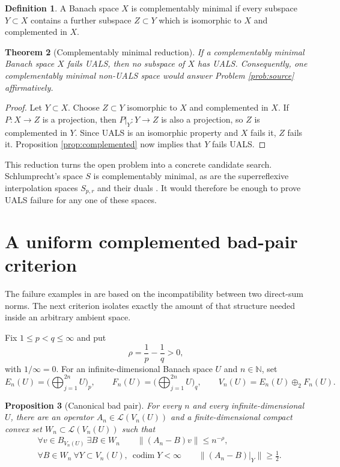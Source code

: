 \documentclass[11pt]{article}
\newtheorem{theorem}{Theorem}[section]
\newtheorem{proposition}[theorem]{Proposition}
\theoremstyle{definition}
\newtheorem{definition}[theorem]{Definition}
\theoremstyle{remark}
\newcommand{\LL}{\mathcal{L}}
\newcommand{\N}{\mathbb{N}}
\newcommand{\codim}{\operatorname{codim}}
\begin{document}
\begin{definition}
A Banach space $X$ is complementably minimal if every subspace $Y\subset X$ contains a further subspace $Z\subset Y$ which is isomorphic to $X$ and complemented in $X$.
\end{definition}

\begin{theorem}[Complementably minimal reduction]\label{thm:cm}
If a complementably minimal Banach space $X$ fails UALS, then no subspace of $X$ has UALS.  Consequently, one complementably minimal non-UALS space would answer Problem \ref{prob:source} affirmatively.
\end{theorem}

\begin{proof}
Let $Y\subset X$.  Choose $Z\subset Y$ isomorphic to $X$ and complemented in $X$.  If $P:X\to Z$ is a projection, then $P|_Y:Y\to Z$ is also a projection, so $Z$ is complemented in $Y$.  Since UALS is an isomorphic property and $X$ fails it, $Z$ fails it.  Proposition \ref{prop:complemented} now implies that $Y$ fails UALS.
\end{proof}

This reduction turns the open problem into a concrete candidate search.  Schlumprecht's space $S$ is complementably minimal, as are the superreflexive interpolation spaces $S_{p,r}$ and their duals \cite{Schlumprecht,CKKM}.  It would therefore be enough to prove UALS failure for any one of these spaces.

\section{A uniform complemented bad-pair criterion}

The failure examples in \cite{AGLM} are based on the incompatibility between two direct-sum norms.  The next criterion isolates exactly the amount of that structure needed inside an arbitrary ambient space.

Fix $1\leq p<q\leq\infty$ and put
\[
  \rho=\frac1p-\frac1q>0,
\]
with $1/\infty=0$.  For an infinite-dimensional Banach space $U$ and $n\in\N$, set
\[
  E_n(U)=\Big(\bigoplus_{j=1}^{2n}U\Big)_p,
  \qquad
  F_n(U)=\Big(\bigoplus_{j=1}^{2n}U\Big)_q,
  \qquad
  V_n(U)=E_n(U)\oplus_2 F_n(U).
\]

\begin{proposition}[Canonical bad pair]\label{prop:canonical}
For every $n$ and every infinite-dimensional $U$, there are an operator $A_n\in\LL(V_n(U))$ and a finite-dimensional compact convex set $W_n\subset\LL(V_n(U))$ such that
\begin{align*}
  &\forall v\in B_{V_n(U)}\ \exists B\in W_n
       \qquad \|(A_n-B)v\|\leq n^{-\rho}, \\
  &\forall B\in W_n\ \forall Y\subset V_n(U),\ \codim Y<\infty
       \qquad \|(A_n-B)|_Y\|\geq \frac12.
\end{align*}
\end{proposition}
\end{document}

